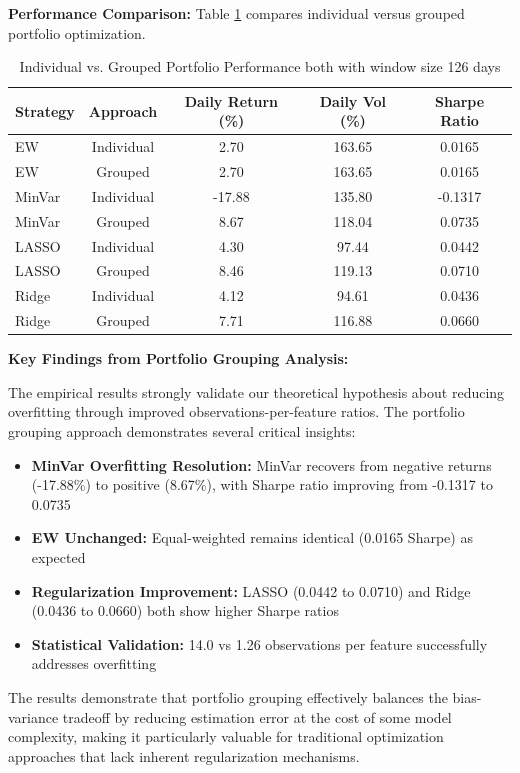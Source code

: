 \documentclass[12pt]{article}
\begin{document}
\textbf{Performance Comparison:}
Table \ref{tab:grouping_comparison} compares individual versus grouped portfolio optimization.

\begin{table}[h]
\centering
\caption{Individual vs. Grouped Portfolio Performance both with window size 126 days}
\label{tab:grouping_comparison}
\begin{tabular}{lcccc}
\hline
Strategy & Approach & Daily Return (\%) & Daily Vol (\%) & Sharpe Ratio \\
\hline
EW & Individual & 2.70 & 163.65 & 0.0165 \\
EW & Grouped & 2.70 & 163.65 & 0.0165 \\
MinVar & Individual & -17.88 & 135.80 & -0.1317 \\
MinVar & Grouped & 8.67 & 118.04 & 0.0735 \\
LASSO & Individual & 4.30 & 97.44 & 0.0442 \\
LASSO & Grouped & 8.46 & 119.13 & 0.0710 \\
Ridge & Individual & 4.12 & 94.61 & 0.0436 \\
Ridge & Grouped & 7.71 & 116.88 & 0.0660 \\
\hline
\end{tabular}
\end{table}

\textbf{Key Findings from Portfolio Grouping Analysis:}

The empirical results strongly validate our theoretical hypothesis about reducing overfitting through improved observations-per-feature ratios. The portfolio grouping approach demonstrates several critical insights:

\begin{itemize}
    \item \textbf{MinVar Overfitting Resolution:} MinVar recovers from negative returns (-17.88\%) to positive (8.67\%), with Sharpe ratio improving from -0.1317 to 0.0735
    \item \textbf{EW Unchanged:} Equal-weighted remains identical (0.0165 Sharpe) as expected
    \item \textbf{Regularization Improvement:} LASSO (0.0442 to 0.0710) and Ridge (0.0436 to 0.0660) both show higher Sharpe ratios
    \item \textbf{Statistical Validation:} 14.0 vs 1.26 observations per feature successfully addresses overfitting
\end{itemize}

The results demonstrate that portfolio grouping effectively balances the bias-variance tradeoff by reducing estimation error at the cost of some model complexity, making it particularly valuable for traditional optimization approaches that lack inherent regularization mechanisms.
\end{document}
